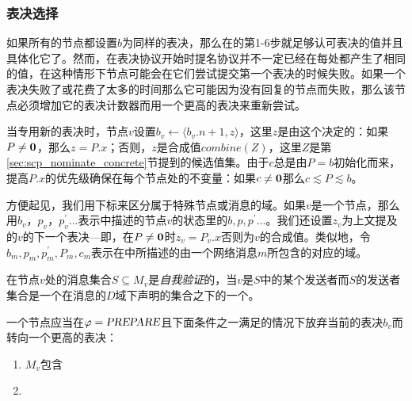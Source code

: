 \subsubsection{表决选择}

如果所有的节点都设置$b$为同样的表决，那么在的第1-6步就足够认可表决的值并且具体化它了。然而，在表决协议开始时提名协议并不一定已经在每处都产生了相同的值，在这种情形下节点可能会在它们尝试提交第一个表决的时候失败。如果一个表决失败了或花费了太多的时间那么它可能因为没有回复的节点而失败，那么该节点必须增加它的表决计数器而用一个更高的表决来重新尝试。

当专用新的表决时，节点$v$设置$b_v\leftarrow \langle b_v.n+1,z\rangle$，这里$z$是由这个决定的：如果$P\neq {\bm 0}$，那么$z=P.x$；否则，$z$是合成值$combine(Z)$，这里$Z$是第\ref{sec:scp_nominate_concrete}节提到的候选值集。由于$c$总是由$P=b$初始化而来，提高$P.x$的优先级确保在每个节点处的不变量：如果$c\neq {\bm 0}$那么$c\lesssim P\lesssim b$。

方便起见，我们用下标来区分属于特殊节点或消息的域。如果$v$是一个节点，那么用$b_v$，$p_v$，$p_v^{\prime}\ldots$表示中描述的节点$v$的状态里的$b,p,p^{\prime}\ldots$。我们还设置$z_v$为上文提及的$v$的下一个表决---即，在$P\neq {\bm 0}$时$z_v=P_v.x$否则为$v$的合成值。类似地，令$b_m,p_m,p^{\prime}_m,P_m,c_m$表示在中所描述的由一个网络消息$m$所包含的对应的域。

\begin{definition}[自我验证]
	在节点$v$处的消息集合$S\subseteq M_v$是\textit{自我验证}的，当$v$是$S$中的某个发送者而$S$的发送者集合是一个在消息的$D$域下声明的{\quorum}集合之下的一个{\quorum}。
\end{definition}

一个节点应当在$\varphi=\textsl{PREPARE}$且下面条件之一满足的情况下放弃当前的表决$b_v$而转向一个更高的表决：

\begin{enumerate}
	\item $M_v$包含
	\item 
\end{enumerate}